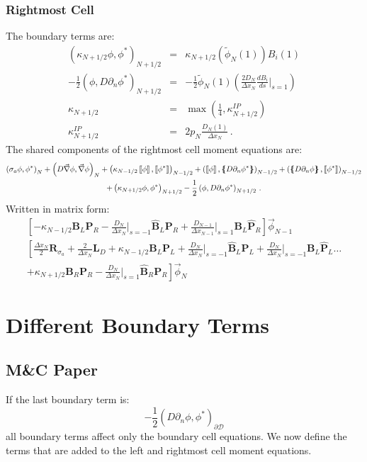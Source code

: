 \documentclass[11pt]{article}
\newcommand{\benum}{\begin{equation}}
\newcommand{\eenum}{\end{equation}}
\newcommand{\beanum}{\begin{eqnarray}}
\newcommand{\eeanum}{\end{eqnarray}}
\newcommand{\del}{\ensuremath{ \vec{\nabla} }}
\newcommand{\B}[1]{\ensuremath{{B_{#1} }}}
\newcommand{\p}{\ensuremath{ d}}
\newcommand{\jmp}[1]{\ensuremath{\left\llbracket #1 \right\rrbracket}}
\newcommand{\avg}[1]{\ensuremath{ \left \{ \hspace{-0.055in} \left \{ #1  \right \}\hspace{-0.055in} \right \} }}
\newcommand{\pep}{\, .}
\begin{document}
\subsubsection{Rightmost Cell}
%
The boundary terms are:
\beanum
\left( \kappa_{N+1/2} \phi, \phi^*\right)_{N+1/2} &=& \kappa_{N+1/2}\left(\widetilde{\phi}_N(1) \right) \B{i}(1) \\
%
%
-\frac{1}{2}\left( \phi, D\partial_n \phi^* \right)_{N+1/2} &=&  -\frac{1}{2}\widetilde{\phi}_N(1) \left(\frac{2 D_N}{\Delta x_N} \frac{\p \B{i}}{\p s} \bigg \lvert_{s=1} \right)\\
%
%
%
\kappa_{N+1/2} &=& \max \left( \frac{1}{4},\kappa_{N+1/2}^{IP} \right) \\
%
%
\kappa_{N + 1/2}^{IP} &=& 2 p_N \frac{D_N(1)}{\Delta x_N} \pep
\eeanum
The shared components of the rightmost cell moment equations are:
\begin{multline*}
\left( \sigma_a\phi,\phi^* \right)_N + \left( D\del\phi,\del\phi \right)_N
 +\left( \kappa_{N-1/2} \jmp{\phi},\jmp{\phi^*}\right)_{N-1/2} 
 +\left(  \jmp{\phi}, \avg{ D\partial_n \phi^*}\right)_{N-1/2} 
 +\left( \avg{D\partial_n\phi}, \jmp{\phi^*} \right)_{N-1/2} \\
  +\left( \kappa_{N+1/2} \phi,\phi^*\right)_{N+1/2}
 -\frac{1}{2}\left( \phi,  D\partial_n \phi^*\right)_{N+1/2} \pep
\end{multline*}
Written in matrix form:
\begin{multline}
\left[ -\kappa_{N-1/2}\mathbf{B}_L \mathbf{P}_R -\frac{D_N}{\Delta x_N} \bigg \lvert_{s=-1} \widehat{\mathbf B}_L \mathbf{P}_R + \frac{D_{N-1}}{\Delta x_{N-1}}\bigg \lvert_{s=1} \mathbf{B}_L \widehat{\mathbf P}_R \right] \vec{\phi}_{N-1} \\
\left[ \frac{\Delta x_N}{2} \mathbf{R}_{\sigma_a} + \frac{2}{\Delta x_N} \mathbf{L}_D + \kappa_{N-1/2} \mathbf{B}_L \mathbf{P}_L + \frac{D_N}{\Delta x_N}\bigg\lvert_{s=-1} \widehat{\mathbf B}_L \mathbf{P}_L + \frac{D_N}{\Delta x_N} \bigg \lvert_{s=-1} \mathbf{B}_L \widehat{\mathbf P}_L  \dots \right. \\
\left.
+ \kappa_{N+1/2} \mathbf{B}_R \mathbf{P}_R - \frac{D_N}{\Delta x_N} \bigg \lvert_{s=1} \widehat{\mathbf B}_R \mathbf{P}_R
\right] \vec{\phi}_N
\end{multline}

\section{Different Boundary Terms}

\subsection{M\&C Paper}
If the last boundary term is:
\benum
-\frac{1}{2}\left(D \partial_n \phi,\phi^*  \right)_{\partial \mathcal D}
\eenum
all boundary terms affect only the boundary cell equations.
We now define the terms that are added to the left and rightmost cell moment equations.
\end{document}
